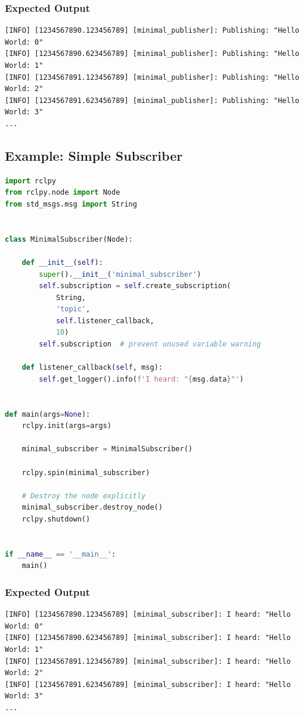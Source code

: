\documentclass[a4paper,12pt]{book}
\begin{document}
\subsubsection{Expected Output}
\begin{verbatim}
[INFO] [1234567890.123456789] [minimal_publisher]: Publishing: "Hello World: 0"
[INFO] [1234567890.623456789] [minimal_publisher]: Publishing: "Hello World: 1"
[INFO] [1234567891.123456789] [minimal_publisher]: Publishing: "Hello World: 2"
[INFO] [1234567891.623456789] [minimal_publisher]: Publishing: "Hello World: 3"
...
\end{verbatim}

\subsection{Example: Simple Subscriber}

\begin{lstlisting}[language=Python, caption=Simple Subscriber in Python]
import rclpy
from rclpy.node import Node
from std_msgs.msg import String


class MinimalSubscriber(Node):

    def __init__(self):
        super().__init__('minimal_subscriber')
        self.subscription = self.create_subscription(
            String,
            'topic',
            self.listener_callback,
            10)
        self.subscription  # prevent unused variable warning

    def listener_callback(self, msg):
        self.get_logger().info(f'I heard: "{msg.data}"')


def main(args=None):
    rclpy.init(args=args)
    
    minimal_subscriber = MinimalSubscriber()
    
    rclpy.spin(minimal_subscriber)
    
    # Destroy the node explicitly
    minimal_subscriber.destroy_node()
    rclpy.shutdown()


if __name__ == '__main__':
    main()
\end{lstlisting}

\subsubsection{Expected Output}
\begin{verbatim}
[INFO] [1234567890.123456789] [minimal_subscriber]: I heard: "Hello World: 0"
[INFO] [1234567890.623456789] [minimal_subscriber]: I heard: "Hello World: 1"
[INFO] [1234567891.123456789] [minimal_subscriber]: I heard: "Hello World: 2"
[INFO] [1234567891.623456789] [minimal_subscriber]: I heard: "Hello World: 3"
...
\end{verbatim}
\end{document}
